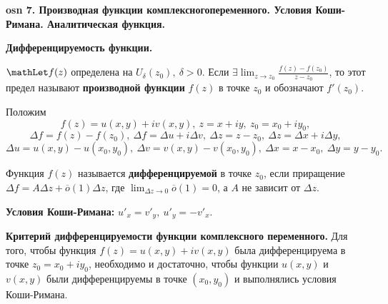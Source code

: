 \textbf{\LARGE osn 7. Производная функции комплексногопеременного. Условия Коши-Римана. Аналитическая  функция.}

\textbf{Дифференцируемость функции.}

$\mathLet f(z)$ определена на $U_{\delta}(z_0),~\delta > 0$. Если $\exists \displaystyle\lim_{z\to z_0} \frac{f(z) - f(z_0)}{z - z_0}$,
то этот предел называют \textbf{производной функции} $f(z)$ в точке $z_0$ и обозначают $f'(z_0)$.

Положим $$f(z) = u(x, y) + iv(x, y),~z = x + iy,~z_0 = x_0 + iy_0,$$
$$\Delta f = f(z)-f(z_0),~\Delta f = \Delta u + i\Delta v,~\Delta z = z- z_0,~\Delta z = \Delta x + i\Delta y,$$
$$\Delta u = u(x, y)-u(x_0, y_0),~\Delta v = v(x, y)-v(x_0, y_0),~\Delta x = x-x_0,~\Delta y = y- y_0.$$

Функция $f(z)$ называется \textbf{дифференцируемой} в точке $z_0$, если приращение $\Delta f = A\Delta z + \overline{o}(1)\Delta z$, где $\displaystyle\lim_{\Delta z\to0} \overline{o}(1) = 0$, а $A$ не зависит от $\Delta z$.

\textbf{Условия Коши-Римана:}
$u'_x = v'_y,~u'_y = -v'_x.$

\textbf{Критерий дифференцируемости функции комплексного переменного.}
Для того, чтобы функция $f(z) = u(x,y)+iv(x,y)$ была дифференцируема в точке $z_0 =x_0+iy_0$, необходимо и достаточно, чтобы функции $u(x,y)$ и $v(x,y)$ были дифференцируемы в точке $(x_0, y_0)$ и выполнялись условия Коши-Римана.

